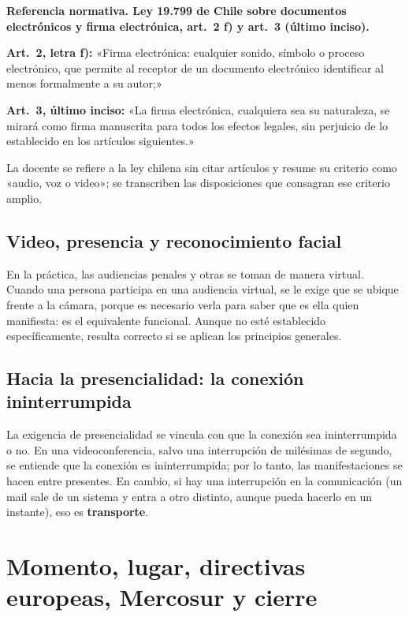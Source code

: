 \documentclass[12pt,oneside]{book}
\begin{document}
\begin{note}
\textbf{Referencia normativa. Ley 19.799 de Chile sobre documentos electrónicos y firma electrónica, art.\ 2 f) y art.\ 3 (último inciso).}

\textbf{Art.\ 2, letra f):} «Firma electrónica: cualquier sonido, símbolo o proceso electrónico, que permite al receptor de un documento electrónico identificar al menos formalmente a su autor;»

\textbf{Art.\ 3, último inciso:} «La firma electrónica, cualquiera sea su naturaleza, se mirará como firma manuscrita para todos los efectos legales, sin perjuicio de lo establecido en los artículos siguientes.»

La docente se refiere a la ley chilena sin citar artículos y resume su criterio como «audio, voz o video»; se transcriben las disposiciones que consagran ese criterio amplio.
\end{note}

\subsection{Video, presencia y reconocimiento facial}

En la práctica, las audiencias penales y otras se toman de manera virtual. Cuando una persona participa en una audiencia virtual, se le exige que se ubique frente a la cámara, porque es necesario verla para saber que es ella quien manifiesta: es el equivalente funcional. Aunque no esté establecido específicamente, resulta correcto si se aplican los principios generales.

\subsection{Hacia la presencialidad: la conexión ininterrumpida}

La exigencia de presencialidad se vincula con que la conexión sea ininterrumpida o no. En una videoconferencia, salvo una interrupción de milésimas de segundo, se entiende que la conexión es ininterrumpida; por lo tanto, las manifestaciones se hacen entre presentes. En cambio, si hay una interrupción en la comunicación (un mail sale de un sistema y entra a otro distinto, aunque pueda hacerlo en un instante), eso es \textbf{transporte}.

\section{Momento, lugar, directivas europeas, Mercosur y cierre}
\end{document}
